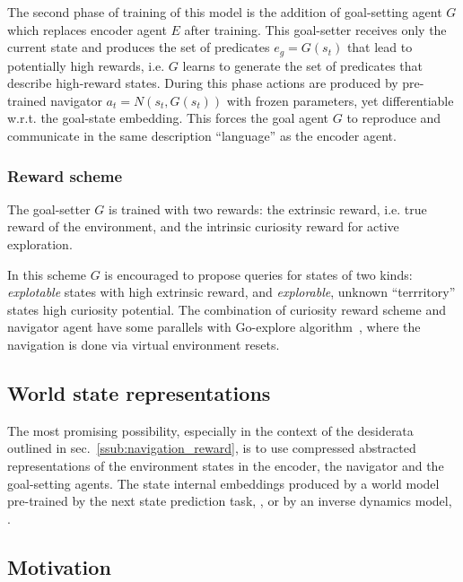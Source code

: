 \documentclass[acmsmall, nonacm]{acmart}
\begin{document}
The second phase of training of this model is the addition of goal-setting agent $G$ which replaces encoder agent $E$ after training.
%
This goal-setter receives only the current state and produces the set of predicates $e_g = G(s_t)$ that lead to potentially high rewards, i.e. $G$ learns to generate the set of predicates that describe high-reward states. During this phase actions are produced by pre-trained navigator $a_t = N(s_t, G(s_t))$ with frozen parameters, yet differentiable w.r.t. the goal-state embedding. This forces the goal agent $G$ to reproduce and communicate in the same description ``language'' as the encoder agent.


\subsubsection{Reward scheme}

The goal-setter $G$ is trained with two rewards: the extrinsic reward, i.e. true reward of the environment, and the intrinsic curiosity reward\textbf{} for active exploration.

In this scheme $G$ is encouraged to propose queries for states of two kinds: \emph{explotable} states with high extrinsic reward, and \emph{explorable}, unknown ``terrritory'' states high curiosity potential.
%
The combination of curiosity reward scheme and navigator agent have some parallels with Go-explore algorithm~\citep{ecoffet_first_2021}, where the navigation is done via virtual environment resets.


\subsection{World state representations}

The most promising possibility, especially in the context of the desiderata outlined in sec.~\ref{ssub:navigation_reward}, is to use compressed abstracted representations of the environment states in the encoder, the navigator and the goal-setting agents. The state internal embeddings produced by a world model pre-trained by the next state prediction task, \citep{ha_recurrent_2018}, or by an inverse dynamics model, \citep{badia_never_2020}.


\subsection{Motivation}
\end{document}
